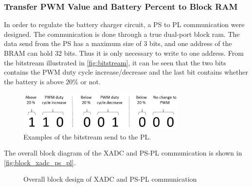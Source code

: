 \documentclass[../report.tex]{subfiles}
\begin{document}
\subsubsection{Transfer PWM Value and Battery Percent to Block RAM}
In order to regulate the battery charger circuit, a PS to PL communication were designed. The communication is done through a true dual-port block ram. The data send from the PS has a maximum size of 3 bits, and one address of the BRAM can hold 32 bits. Thus it is only necessary to write to one address. From the bitstream illustrated in \autoref{fig:bitstream}, it can be seen that the two bits contains the PWM duty cycle increase/decrease and the last bit contains whether the battery is above $20\%$ or not.

\begin{figure}[H]
    \centering
    \includegraphics[width=0.75\textwidth]{figures/xadc/bitstream.png}
    \caption{Examples of the bitstream send to the PL.}
    \label{fig:bitstream}
\end{figure}

The overall block diagram of the XADC and PS-PL communication is shown in \autoref{fig:block_xadc_ps_pl}.

\begin{figure}[H]
    \centering    
    \noindent{}
    \caption{Overall block design of XADC and PS-PL communication}
    \label{fig:block_xadc_ps_pl}
\end{figure}
\end{document}
